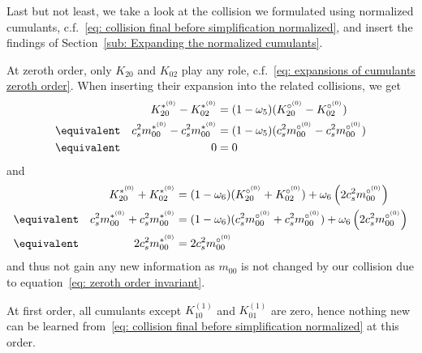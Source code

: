 Last but not least, we take a look at the collision we formulated using normalized cumulants, c.f.~\eqref{eq: collision final before simplification normalized},
and insert the findings of Section~\ref{sub: Expanding the normalized cumulants}.

At zeroth order, only $K_{20}$ and $K_{02}$ play any role, c.f.~\eqref{eq: expansions of cumulants zeroth order}.
When inserting their expansion into the related collisions, we get
\begin{equation}
  \begin{aligned}
    &&
    K_{20}^{*^{(0)}} - K_{02}^{*^{(0)}}
      & = (1-\omega_5) (K_{20}^{\circ^{(0)}} - K_{02}^{\circ^{(0)}})
      \\ &\equivalent&
    c_s^2 m_{00}^{*^{(0)}} - c_s^2 m_{00}^{*^{(0)}}
        & = (1-\omega_5) (c_s^2 m_{00}^{\circ^{(0)}} - c_s^2 m_{00}^{\circ^{(0)}})
      \\ &\equivalent&
    0 & = 0
  \end{aligned}
\end{equation}
and
\begin{equation}
  \begin{aligned}
    &&K_{20}^{*^{(0)}} + K_{02}^{*^{(0)}}
      & = (1-\omega_6)(K_{20}^{\circ^{(0)}} + K_{02}^{\circ^{(0)}}) + \omega_6 \left( 2 c_s^2 m_{00}^{\circ^{(0)}} \right)
      \\ &\equivalent&
    c_s^2 m_{00}^{*^{(0)}} + c_s^2 m_{00}^{*^{(0)}}
      & = (1-\omega_6)(c_s^2 m_{00}^{\circ^{(0)}} + c_s^2 m_{00}^{\circ^{(0)}}) + \omega_6 \left( 2 c_s^2 m_{00}^{\circ^{(0)}} \right)
      \\ &\equivalent&
    2c_s^2 m_{00}^{*^{(0)}}
      & = 2 c_s^2 m_{00}^{\circ^{(0)}}
  \end{aligned}
\end{equation}
and thus not gain any new information as $m_{00}$ is not changed by our collision due to equation~\eqref{eq: zeroth order invariant}.

At first order, all cumulants except $K_{10}^{(1)}$ and $K_{01}^{(1)}$ are zero, hence nothing new can be learned from~\eqref{eq: collision final before simplification normalized} at this order.

